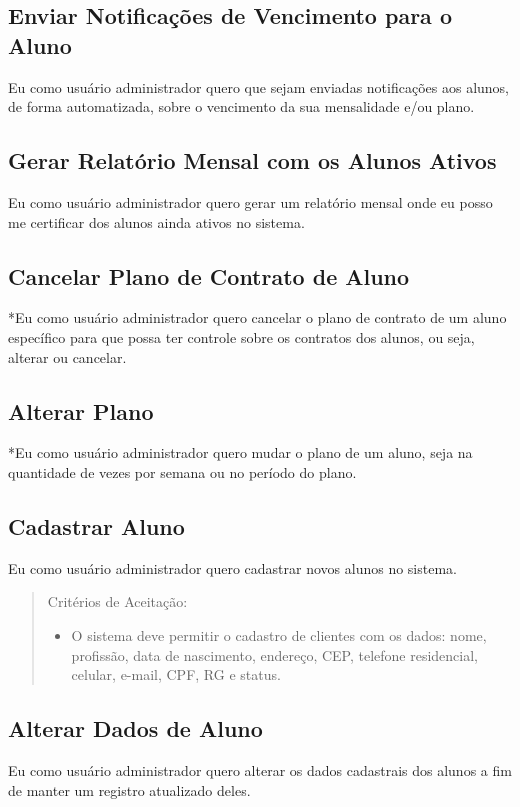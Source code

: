 \subsection[Enviar Notificações de Vencimento para o Aluno]{Enviar Notificações de Vencimento para o Aluno}
Eu como usuário administrador quero que sejam enviadas notificações aos alunos,
de forma automatizada, sobre o vencimento da sua mensalidade e/ou plano.

\subsection[Gerar Relatório Mensal com os Alunos Ativos]{Gerar Relatório Mensal com os Alunos Ativos}
Eu como usuário administrador quero gerar um relatório mensal onde eu posso me
certificar dos alunos ainda ativos no sistema.

\subsection[Cancelar Plano de Contrato de Aluno]{Cancelar Plano de Contrato de Aluno}
*Eu como usuário administrador quero cancelar o plano de contrato de um aluno
específico para que possa ter controle sobre os contratos dos alunos, ou seja,
alterar ou cancelar.

\subsection[Alterar Plano]{Alterar Plano}
*Eu como usuário administrador quero mudar o plano de um aluno, seja na
quantidade de vezes por semana ou no período do plano.

\subsection[Cadastrar Aluno]{Cadastrar Aluno}
Eu como usuário administrador quero cadastrar novos alunos no sistema.

\begin{quote}
Critérios de Aceitação:
    \begin{itemize}
        \item O sistema deve permitir o cadastro de clientes com os dados: nome, profissão,
        data de nascimento, endereço, CEP, telefone residencial, celular, e-mail, CPF,
        RG e status.
    \end{itemize}
\end{quote}

\subsection[Alterar Dados de Aluno]{Alterar Dados de Aluno}
Eu como usuário administrador quero alterar os dados cadastrais dos alunos a fim
de manter um registro atualizado deles.


